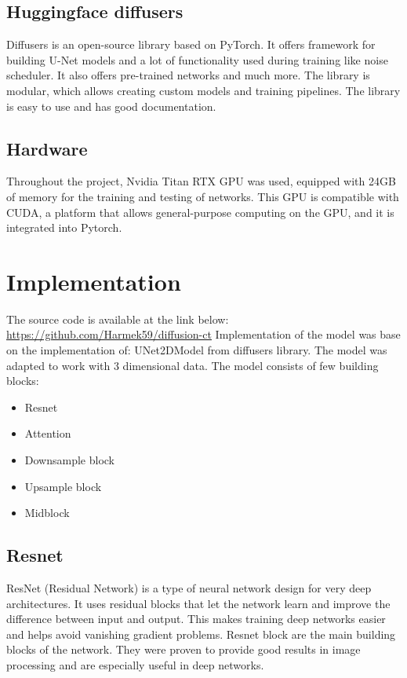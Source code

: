 \documentclass[11pt,a4paper]{report}
\begin{document}
\subsection{Huggingface diffusers}
Diffusers is an open-source library based on PyTorch. It offers framework for building U-Net models and a lot of functionality used during training like noise scheduler. It also offers pre-trained networks and much more. The library is modular, which allows creating custom models and training pipelines. The library is easy to use and has good documentation. \cite{Hf_diffusers}
\subsection{Hardware}
Throughout the project, Nvidia Titan RTX GPU was used, equipped with 24GB of memory for the training and testing of networks. This GPU is compatible with CUDA, a platform that allows general-purpose computing on the GPU, and it is integrated into Pytorch.
\section{Implementation}
The source code is available at the link below:
\newline
\url{https://github.com/Harmek59/diffusion-ct}
\newline
Implementation of the model was base on the implementation of: UNet2DModel from diffusers library. The model was adapted to work with 3 dimensional data.
The model consists of few building blocks:
\begin{itemize}
\item Resnet
\item Attention
\item Downsample block
\item Upsample block
\item Midblock
\end{itemize}
\subsection{Resnet}
ResNet (Residual Network) is a type of neural network design for very deep architectures. It uses residual blocks that let the network learn and improve the difference between input and output. This makes training deep networks easier and helps avoid vanishing gradient problems. \cite{Resnet} Resnet block are the main building blocks of the network. They were proven to provide good results in image processing and are especially useful in deep networks.
\end{document}
